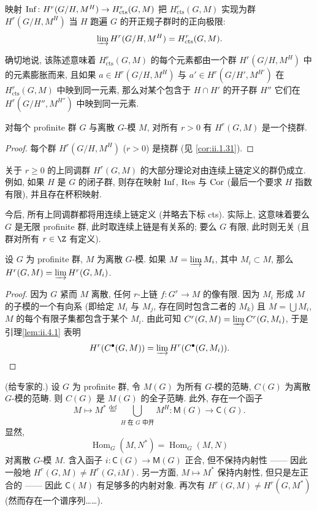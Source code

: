 \begin{proposition}\label{prop:ii.4.2}
映射 $\operatorname{Inf}\colon H^r(G/H,M^H)\to H_{\mathrm{cts}}^r(G,M)$ 把 $H_{\mathrm{cts}}^r(G,M)$ 实现为群 $H^r(G/H,M^H)$ 当 $H$ 跑遍 $G$ 的开正规子群时的正向极限:
\[
 \varinjlim H^r(G/H,M^H)=H_{\mathrm{cts}}^r(G,M).
\]
\end{proposition}

确切地说, 该陈述意味着 $H_{\mathrm{cts}}^r(G,M)$ 的每个元素都由一个群 $H^r(G/H,M^H)$ 中的元素膨胀而来, 且如果 $a\in H^r(G/H,M^H)$ 与 $a'\in H^r(G/H',M^{H'})$ 在 $H_{\mathrm{cts}}^r(G,M)$ 中映到同一元素, 那么对某个包含于 $H\cap H'$ 的开子群 $H''$ 它们在 $H^r(G/H'',M^{H''})$ 中映到同一元素.

\begin{corollary}\label{cor:ii.4.3}
对每个 profinite 群 $G$ 与离散 $G$-模 $M$, 对所有 $r>0$ 有 $H^r(G,M)$ 是一个挠群.
\end{corollary}

\begin{proof}
每个群 $H^r(G/H,M^H)$ ($r>0$) 是挠群 (见 \ref{cor:ii.1.31}).
\end{proof}

关于 $r\ge 0$ 的上同调群 $H^r(G,M)$ 的大部分理论对由连续上链定义的群仍成立. 例如, 如果 $H$ 是 $G$ 的闭子群, 则存在映射 $\operatorname{Inf}$, $\operatorname{Res}$ 与 $\operatorname{Cor}$ (最后一个要求 $H$ 指数有限), 并且存在杯积映射.

今后, 所有上同调群都将用连续上链定义 (并略去下标 cts). 实际上, 这意味着要么 $G$ 是无限 profinite 群, 此时取连续上链是有关系的; 要么 $G$ 有限, 此时则无关 (且群对所有 $r\in\Z$ 有定义).

\begin{proposition}\label{prop:ii.4.4}
设 $G$ 为 profinite 群, $M$ 为离散 $G$-模. 如果 $M=\varinjlim M_i$, 其中 $M_i\subset M$, 那么 $H^r(G,M)=\varinjlim H^r(G,M_i)$.
\end{proposition}

\begin{proof}
因为 $G$ 紧而 $M$ 离散, 任何 $r$-上链 $f\colon G^r\to M$ 的像有限. 因为 $M_i$ 形成 $M$ 的子模的一个有向系 (即给定 $M_i$ 与 $M_j$, 存在同时包含二者的 $M_k$) 且 $M=\bigcup M_i$, $M$ 的每个有限子集都包含于某个 $M_i$. 由此可知 $C^r(G,M)=\varinjlim C^r(G,M_i)$, 于是引理\ref{lem:ii.4.1} 表明
\[
 H^r(C^\bullet(G,M))=\varinjlim H^r(C^\bullet(G,M_i)).
\]
\end{proof}

\begin{aside}\label{as:ii.4.5}
(给专家的.) 设 $G$ 为 profinite 群, 令 $M(G)$ 为所有 $G$-模的范畴, $C(G)$ 为离散 $G$-模的范畴. 则 $C(G)$ 是 $M(G)$ 的全子范畴. 此外, 存在一个函子
\[
 M\mapsto M^*\stackrel{\mathrm{def}}{=}\bigcup_{H\text{ 在 }G\text{ 中开}} M^H\colon \mathsf{M}(G)\to \mathsf{C}(G).
\]
显然,
\[
 \operatorname{Hom}_G(M,N^*)=\operatorname{Hom}_G(M,N)
\]
对离散 $G$-模 $M$. 含入函子 $i\colon \mathsf{C}(G)\to \mathsf{M}(G)$ 正合, 但不保持内射性 —— 因此一般地 $H^r(G,M)\neq H^r(G,iM)$. 另一方面, $M\mapsto M^*$ 保持内射性, 但只是左正合的 —— 因此 $\mathsf{C}(M)$ 有足够多的内射对象. 再次有 $H^r(G,M)\neq H^r(G,M^*)$ (然而存在一个谱序列……).
\end{aside}

